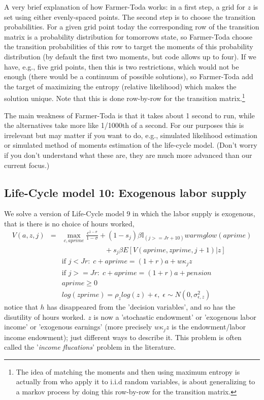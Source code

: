 A very brief explanation of how Farmer-Toda works: in a first step, a grid for $z$ is set using either evenly-spaced points. The second step is to choose the transition probabilities. For a given grid point today the corresponding row of the transition matrix is a probability distribution for tomorrows state, so Farmer-Toda choose the transition probabilities of this row to target the moments of this probability distribution (by default the first two moments, but code allows up to four). If we have, e.g., five grid points, then this is two restrictions, which would not be enough (there would be a continuum of possible solutions), so Farmer-Toda add the target of maximizing the entropy (relative likelihood) which makes the solution unique. Note that this is done row-by-row for the transition matrix.\footnote{The idea of matching the moments and then using maximum entropy is actually from \cite*{TanakaToda2013} who apply it to i.i.d random variables, \cite*{FarmerToda2017} is about generalizing to a markov process by doing this row-by-row for the transition matrix.}

The main weakness of Farmer-Toda is that it takes about 1 second to run, while the alternatives take more like 1/1000th of a second. For our purposes this is irrelevant but may matter if you want to do, e.g., simulated likelihood estimation or simulated method of moments estimation of the life-cycle model. (Don't worry if you don't understand what these are, they are much more advanced than our current focus.)

\subsection{Life-Cycle model 10: Exogenous labor supply}
We solve a version of Life-Cycle model 9 in which the labor supply is exogenous, that is there is no choice of hours worked,
\begin{eqnarray*}
 V(a,z,j)&=& \max_{c,aprime} \frac{c^{1-\sigma}}{1-\sigma}+ (1-s_j)\beta  \mathbb{I}_{(j>=Jr+10)} warmglow(aprime)   \\
 && \quad \quad \quad \quad \quad \quad   + s_j \beta E[V(aprime,zprime,j+1)|z] \\
&& \text{if }j<Jr: \; c+aprime=(1+r)a+w \kappa_j z\\
&& \text{if }j>=Jr: \; c+aprime=(1+r)a +pension\\
&& aprime\geq 0 \\
&& log(zprime)=\rho_z log(z) + \epsilon, \; \epsilon \sim N(0,\sigma_{\epsilon,z}^2)
\end{eqnarray*}
notice that $h$ has disappeared from the 'decision variables', and so has the disutility of hours worked. $z$ is now a 'stochastic endowment' or 'exogenous labor income' or 'exogenous earnings' (more precisely $w \kappa_j z$ is the endowment/labor income endowment); just different ways to describe it.  This problem is often called the '\textit{income flucations}' problem in the literature.

